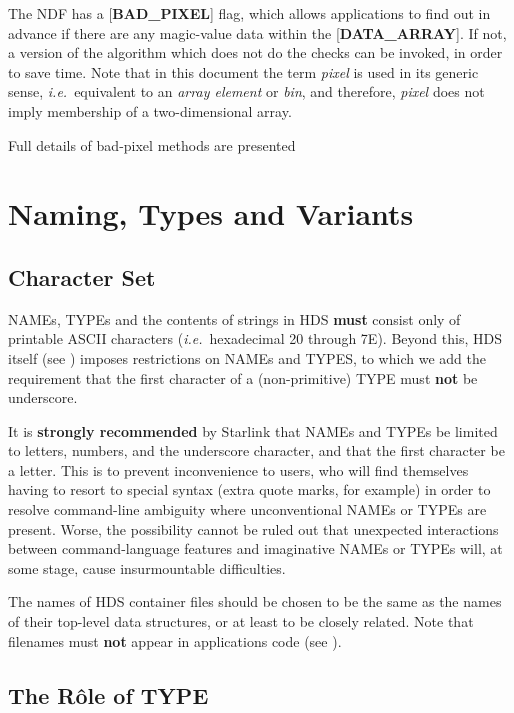 The NDF has a {[}{\bf BAD\_PIXEL}{]} flag, which allows applications
to find out in advance if there are any
magic-value data within the {[}{\bf DATA\_ARRAY}{]}.  If not, a
version of the algorithm which does not do the checks can be
invoked, in order to save time.  Note that in this document the term
{\em pixel} is used in its generic sense, {\it i.e.}\ equivalent to
an {\em array element} or {\em bin}, and therefore, {\em pixel}
does not imply membership of a two-dimensional array.

Full details of bad-pixel methods are presented

\section{Naming, Types and
Variants\label{se:natyvar}}

\subsection{Character Set\label{se:charset}}

NAMEs, TYPEs and the contents of strings in HDS
{\bf must} consist only of
printable ASCII characters ({\it i.e.}\ hexadecimal
20 through 7E).  Beyond this, HDS itself
(see ) imposes restrictions on NAMEs and TYPES,
to which we add the
requirement that the first character of a
(non-primitive) TYPE must {\bf not} be
underscore.

It is {\bf strongly recommended} by Starlink that NAMEs and TYPEs
be limited to letters, numbers, and the underscore character, and
that the first character be a letter.  This is to
prevent inconvenience
to users, who will find themselves having to resort
to special syntax (extra quote marks, for example) in order to
resolve
command-line ambiguity where unconventional NAMEs or TYPEs are
present.  Worse, the possibility cannot be ruled out that
unexpected interactions
between command-language features and imaginative NAMEs or TYPEs
will, at some stage, cause insurmountable difficulties.

The names of HDS container files should be chosen to be the
same as the names of their top-level data structures, or at
least to be closely related.  Note that filenames must {\bf not}
appear in applications code (see ).

\subsection{The R\^{o}le of TYPE\label{se:roleoftype}}

